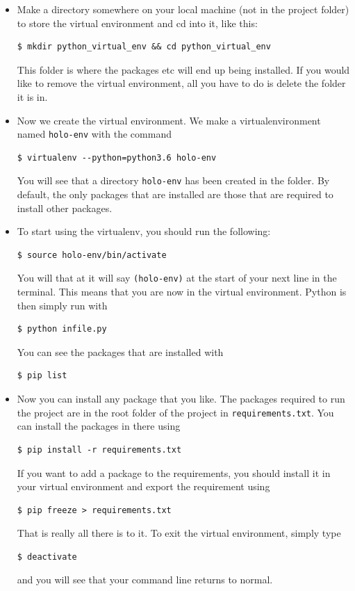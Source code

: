 \documentclass[a4paper,12pt]{article}
\begin{document}
\begin{itemize}
\item Make a directory somewhere on your local machine (not in the project folder) to store the virtual environment and cd into it, like this:
\begin{lstlisting}
$ mkdir python_virtual_env && cd python_virtual_env
\end{lstlisting} This folder is where the packages etc will end up being installed. If you would like to remove the virtual environment, all you have to do is delete the folder it is in. 
\item Now we create the virtual environment. We make a virtualenvironment named \texttt{holo-env} with the command
\begin{lstlisting}
$ virtualenv --python=python3.6 holo-env
\end{lstlisting}
You will see that a directory \texttt{holo-env} has been created in the folder. By default, the only packages that are installed are those that are required to install other packages.
\item To start using the virtualenv, you should run the following: 
\begin{lstlisting}
$ source holo-env/bin/activate
\end{lstlisting}
You will that at it will say \texttt{(holo-env)} at the start of your next line in the terminal. This means that you are now in the virtual environment. Python is then simply run with 
\begin{lstlisting}
$ python infile.py
\end{lstlisting}
You can see the packages that are installed with 
\begin{lstlisting}
$ pip list
\end{lstlisting}
\item Now you can install any package that you like. The packages required to run the project are in the root folder of the project in \texttt{requirements.txt}. You can install the packages in there using 
\begin{lstlisting}
$ pip install -r requirements.txt
\end{lstlisting}
If you want to add a package to the requirements, you should install it in your virtual environment and export the requirement using 
\begin{lstlisting}
$ pip freeze > requirements.txt
\end{lstlisting}
That is really all there is to it. To exit the virtual environment, simply type 
\begin{lstlisting}
$ deactivate
\end{lstlisting}
and you will see that your command line returns to normal.
\end{itemize}
\end{document}

